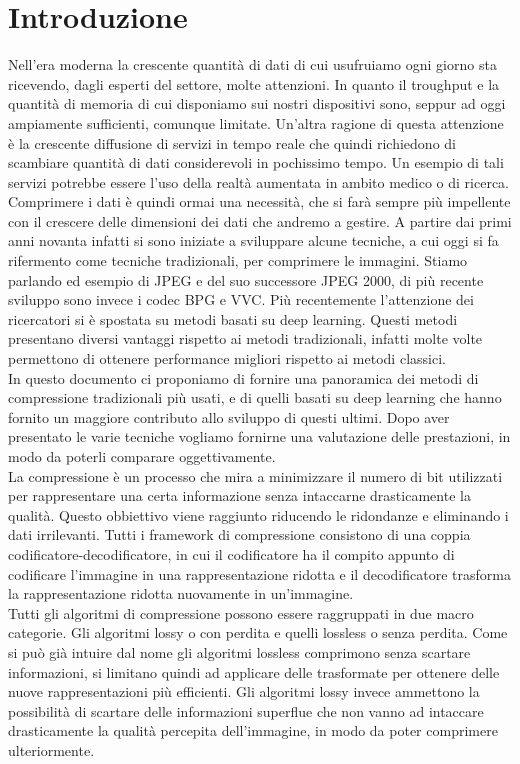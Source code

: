 \chapter*{Introduzione}
Nell’era moderna la crescente quantità di dati di cui usufruiamo ogni giorno sta ricevendo, dagli esperti del settore, molte attenzioni. In quanto il troughput e la quantità di memoria di cui disponiamo sui nostri dispositivi sono, seppur ad oggi ampiamente sufficienti, comunque limitate. Un’altra ragione di questa attenzione è la crescente diffusione di servizi in tempo reale che quindi richiedono di scambiare quantità di dati considerevoli in pochissimo tempo. Un esempio di tali servizi potrebbe essere l’uso della realtà aumentata in ambito medico o di ricerca. Comprimere i dati è quindi ormai una necessità, che si farà sempre più impellente con il crescere delle dimensioni dei dati che andremo a gestire.
A partire dai primi anni novanta infatti si sono iniziate a sviluppare alcune tecniche, a cui oggi si fa rifermento come tecniche tradizionali, per comprimere le immagini. Stiamo parlando ed esempio di JPEG e del suo successore JPEG 2000, di più recente sviluppo sono invece i codec BPG e VVC.
Più recentemente l’attenzione dei ricercatori si è spostata su metodi basati su deep learning. Questi metodi presentano diversi vantaggi rispetto ai metodi tradizionali, infatti molte volte permettono di ottenere performance migliori rispetto ai metodi classici.\\
In questo documento ci proponiamo di fornire una panoramica dei metodi di compressione tradizionali più usati, e di quelli basati su deep learning che hanno fornito un maggiore contributo allo sviluppo di questi ultimi. Dopo aver presentato le varie tecniche vogliamo fornirne una valutazione delle prestazioni, in modo da poterli comparare oggettivamente.\\
La compressione è un processo che mira a minimizzare il numero di bit utilizzati per rappresentare una certa informazione senza intaccarne drasticamente la qualità. Questo obbiettivo viene raggiunto riducendo le ridondanze e eliminando i dati irrilevanti.
Tutti i framework di compressione consistono di una coppia codificatore-decodificatore, in cui il codificatore ha il compito appunto di codificare l’immagine in una rappresentazione ridotta e il decodificatore trasforma la rappresentazione ridotta nuovamente in un’immagine.\\
Tutti gli algoritmi di compressione possono essere raggruppati in due macro categorie. Gli algoritmi lossy o con perdita e quelli lossless o senza perdita. Come si può già intuire dal nome gli algoritmi lossless comprimono senza scartare informazioni, si limitano quindi ad applicare delle trasformate per ottenere delle nuove rappresentazioni più efficienti. Gli algoritmi lossy invece ammettono la possibilità di scartare delle informazioni superflue che non vanno ad intaccare drasticamente la qualità percepita dell’immagine, in modo da poter comprimere ulteriormente.
